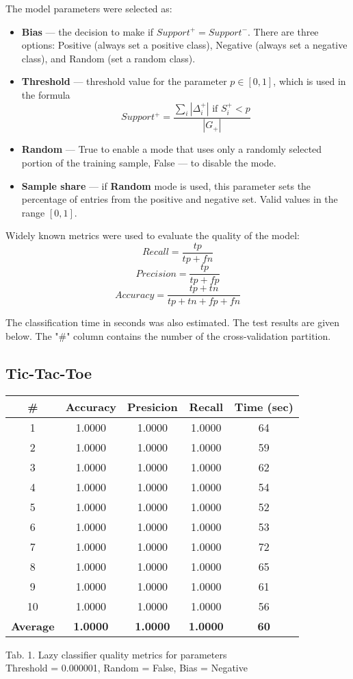 \documentclass{article}
\begin{document}
The model parameters were selected as:
\begin{itemize}
    \item \textbf{Bias} --- the decision to make if $Support^+ = Support^ -$. There are three options: Positive (always set a positive class), Negative (always set a negative class), and Random (set a random class).
    \item \textbf{Threshold} --- threshold value for the parameter $p \in [0, 1]$, which is used in the formula
    $$Support^+ = \frac{\sum_i |\Delta_i^+| \text{ if } S_i^+<p}{|G_+|}$$
    \item \textbf{Random} --- True to enable a mode that uses only a randomly selected portion of the training sample, False --- to disable the mode.
    \item \textbf{Sample share} --- if \textbf{Random} mode is used, this parameter sets the percentage of entries from the positive and negative set. Valid values in the range $[0, 1]$.
\end{itemize}
Widely known metrics were used to evaluate the quality of the model:
$$Recall = \frac{tp}{tp+fn}$$
$$Precision = \frac{tp}{tp+fp}$$
$$Accuracy = \frac{tp + tn}{tp + tn + fp + fn}$$

The classification time in seconds was also estimated. The test results are given below. The "\#" column contains the number of the cross-validation partition.

\subsection{Tic-Tac-Toe}

\begin{center}
    \begin{tabular}{|c|c|c|c|c|}
        \hline
        \# & \textbf{Accuracy} & \textbf{Presicion} & \textbf{Recall} & \textbf{Time (sec)}  \\
        \hline
        1 & 1.0000 & 1.0000 & 1.0000 & 64 \\
        2 & 1.0000 & 1.0000 & 1.0000 & 59 \\
        3 & 1.0000 & 1.0000 & 1.0000 & 62 \\
        4 & 1.0000 & 1.0000 & 1.0000 & 54 \\
        5 & 1.0000 & 1.0000 & 1.0000 & 52 \\
        6 & 1.0000 & 1.0000 & 1.0000 & 53 \\
        7 & 1.0000 & 1.0000 & 1.0000 & 72 \\
        8 & 1.0000 & 1.0000 & 1.0000 & 65 \\
        9 & 1.0000 & 1.0000 & 1.0000 & 61 \\
        10 & 1.0000 & 1.0000 & 1.0000 & 56 \\
        \hline
        \textbf{Average} & \textbf{1.0000} & \textbf{1.0000} & \textbf{1.0000} & \textbf{60} \\
        \hline
    \end{tabular}
    
    Tab. 1. Lazy classifier quality metrics for parameters \\Threshold = 0.000001, Random = False, Bias = Negative
\end{center}
\end{document}
